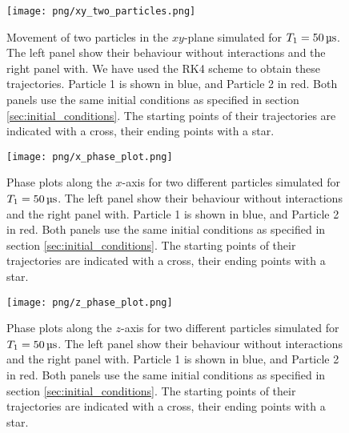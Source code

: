 \begin{figure}
    \texttt{[image: png/xy\_two\_particles.png]}
    \caption{Movement of two particles in the $xy$-plane simulated for $T_1=50\,\mus$. The left panel show their behaviour without interactions and the right panel with. We have used the RK4 scheme to obtain these trajectories. Particle 1 is shown in blue, and Particle 2 in red. Both panels use the same initial conditions as specified in section \ref{sec:initial_conditions}. The starting points of their trajectories are indicated with a cross, their ending points with a star.}
    \label{fig:xy_two_particles}
\end{figure}

\begin{figure}
    \texttt{[image: png/x\_phase\_plot.png]}
    \caption{Phase plots along the $x$-axis for two different particles simulated for $T_1=50\,\mus$. The left panel show their behaviour without interactions and the right panel with. Particle 1 is shown in blue, and Particle 2 in red. Both panels use the same initial conditions as specified in section \ref{sec:initial_conditions}. The starting points of their trajectories are indicated with a cross, their ending points with a star.}
    \label{fig:x_phase_two_particles}
\end{figure} 

\begin{figure}
    \texttt{[image: png/z\_phase\_plot.png]}
    \caption{Phase plots along the $z$-axis for two different particles simulated for $T_1=50\,\mus$. The left panel show their behaviour without interactions and the right panel with. Particle 1 is shown in blue, and Particle 2 in red. Both panels use the same initial conditions as specified in section \ref{sec:initial_conditions}. The starting points of their trajectories are indicated with a cross, their ending points with a star.}
    \label{fig:z_phase_two_particles}
\end{figure}

